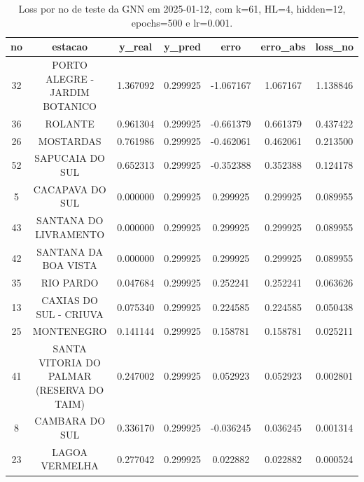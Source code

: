 \begin{table}[h]
\centering
\caption{Loss por no de teste da GNN em 2025-01-12, com k=61, HL=4, hidden=12, epochs=500 e lr=0.001.}
\label{tab:gnn_loss_k61_hl4_h12_e500_d20250112}
\begin{tabular}{ccccccc}
\toprule
no & estacao & y\_real & y\_pred & erro & erro\_abs & loss\_no \\
\midrule
32 & PORTO ALEGRE - JARDIM BOTANICO & 1.367092 & 0.299925 & -1.067167 & 1.067167 & 1.138846 \\
36 & ROLANTE & 0.961304 & 0.299925 & -0.661379 & 0.661379 & 0.437422 \\
26 & MOSTARDAS & 0.761986 & 0.299925 & -0.462061 & 0.462061 & 0.213500 \\
52 & SAPUCAIA DO SUL & 0.652313 & 0.299925 & -0.352388 & 0.352388 & 0.124178 \\
5 & CACAPAVA DO SUL & 0.000000 & 0.299925 & 0.299925 & 0.299925 & 0.089955 \\
43 & SANTANA DO LIVRAMENTO & 0.000000 & 0.299925 & 0.299925 & 0.299925 & 0.089955 \\
42 & SANTANA DA BOA VISTA & 0.000000 & 0.299925 & 0.299925 & 0.299925 & 0.089955 \\
35 & RIO PARDO & 0.047684 & 0.299925 & 0.252241 & 0.252241 & 0.063626 \\
13 & CAXIAS DO SUL - CRIUVA & 0.075340 & 0.299925 & 0.224585 & 0.224585 & 0.050438 \\
25 & MONTENEGRO & 0.141144 & 0.299925 & 0.158781 & 0.158781 & 0.025211 \\
41 & SANTA VITORIA DO PALMAR (RESERVA DO TAIM) & 0.247002 & 0.299925 & 0.052923 & 0.052923 & 0.002801 \\
8 & CAMBARA DO SUL & 0.336170 & 0.299925 & -0.036245 & 0.036245 & 0.001314 \\
23 & LAGOA VERMELHA & 0.277042 & 0.299925 & 0.022882 & 0.022882 & 0.000524 \\
\bottomrule
\end{tabular}
\end{table}
